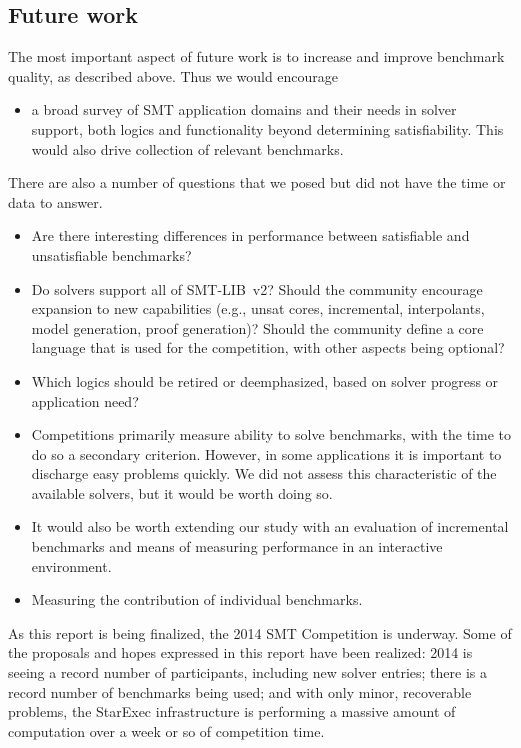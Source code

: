\documentclass{eptcs}
\begin{document}
\subsection{Future work}
The most important aspect of future work is to increase and improve benchmark quality, as described above. Thus we would encourage
\begin{itemize}
\item a broad survey of SMT application domains and their needs in solver support, both logics and functionality beyond determining satisfiability. This would also drive collection of relevant benchmarks.
\end{itemize}
There are also a number of questions that we posed but did not have the time or data to answer. 
\begin{itemize}
\item Are there interesting differences in performance between satisfiable and unsatisfiable benchmarks?
\item Do solvers support all of SMT-LIB~v2? Should the community encourage expansion to new capabilities (e.g., unsat cores, incremental, interpolants, model generation, proof generation)? Should the community define a core language that is used for the competition, with other aspects being optional?
\item Which logics should be retired or deemphasized, based on solver progress or application need?
\item Competitions primarily measure ability to solve benchmarks, with the time to do so a secondary criterion. However, in some applications it is important to discharge easy problems quickly. We did not assess this characteristic of the available solvers, but it would be worth doing so.
\item It would also be worth extending our study with an evaluation of incremental benchmarks and means of measuring performance in an interactive environment.
\item Measuring the contribution of individual benchmarks.
\end{itemize}

As this report is being finalized, the 2014 SMT Competition is underway. Some of the proposals and hopes expressed in this report have been realized: 2014 is seeing a record number of participants, including new solver entries; there is a record number of benchmarks being used; and with only minor, recoverable problems, the StarExec infrastructure is performing a massive amount of computation over a week or so of competition time.
\end{document}
